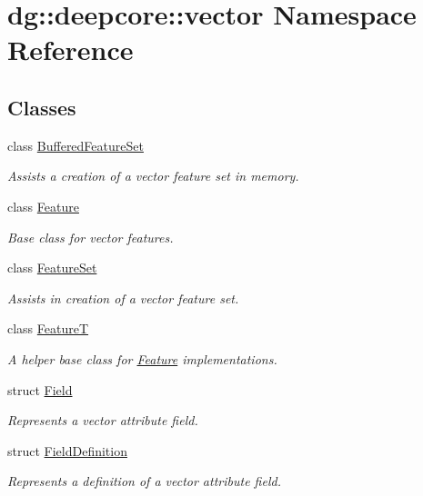 \hypertarget{namespacedg_1_1deepcore_1_1vector}{}\section{dg\+:\+:deepcore\+:\+:vector Namespace Reference}
\label{namespacedg_1_1deepcore_1_1vector}
\subsection*{Classes}
\begin{DoxyCompactItemize}
\item 
class \hyperlink{classdg_1_1deepcore_1_1vector_1_1_buffered_feature_set}{Buffered\+Feature\+Set}
\begin{DoxyCompactList}\small\item\em Assists a creation of a vector feature set in memory. \end{DoxyCompactList}\item 
class \hyperlink{classdg_1_1deepcore_1_1vector_1_1_feature}{Feature}
\begin{DoxyCompactList}\small\item\em Base class for vector features. \end{DoxyCompactList}\item 
class \hyperlink{classdg_1_1deepcore_1_1vector_1_1_feature_set}{Feature\+Set}
\begin{DoxyCompactList}\small\item\em Assists in creation of a vector feature set. \end{DoxyCompactList}\item 
class \hyperlink{structdg_1_1deepcore_1_1vector_1_1_feature_t}{FeatureT}
\begin{DoxyCompactList}\small\item\em A helper base class for \hyperlink{classdg_1_1deepcore_1_1vector_1_1_feature}{Feature} implementations. \end{DoxyCompactList}\item 
struct \hyperlink{structdg_1_1deepcore_1_1vector_1_1_field}{Field}
\begin{DoxyCompactList}\small\item\em Represents a vector attribute field. \end{DoxyCompactList}\item 
struct \hyperlink{structdg_1_1deepcore_1_1vector_1_1_field_definition}{Field\+Definition}
\begin{DoxyCompactList}\small\item\em Represents a definition of a vector attribute field. \end{DoxyCompactList}\end{DoxyCompactItemize}
